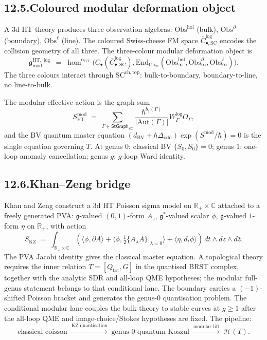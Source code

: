 \documentclass[11pt,reqno]{amsart}
\theoremstyle{definition}
\theoremstyle{remark}
\providecommand{\cH}{\mathcal{H}}
\providecommand{\Aut}{\mathrm{Aut}}
\providecommand{\FM}{\overline{C}}
\providecommand{\fg}{\mathfrak{g}}
\providecommand{\hol}{\mathrm{hol}}
\providecommand{\bC}{\mathbb{C}}
\providecommand{\bR}{\mathbb{R}}
\providecommand{\SCchtop}{\mathrm{SC}^{\mathrm{ch,top}}}
\providecommand{\End}{\mathrm{End}}
\providecommand{\KZ}{\mathrm{KZ}}
\providecommand{\SC}{\mathrm{SC}}
\providecommand{\BV}{\mathrm{BV}}
\renewcommand{\mod}{\mathrm{mod}}
\providecommand{\Obs}{\mathrm{Obs}}
\providecommand{\Ch}{\mathrm{Ch}}
\numberwithin{equation}{section}
\begin{document}
\subsection*{12.5.\enspace Coloured modular deformation object}

A 3d HT theory produces three observation algebras:
$\Obs^{\hol}$ (bulk), $\Obs^\partial$ (boundary), $\Obs^\ell$
(line). The coloured Swiss-cheese FM space
$\FM^{\log}_{\bullet, \SC}$ encodes the collision geometry of
all three. The three-colour modular deformation object is
\[
\fg^{\mathrm{HT},\log}_{\mod}
\;=\;
\hom^{\alpha_{\mathrm{HT}}}\!\bigl(
C_\bullet(\FM^{\log}_{\bullet, \SC}),
\End_{\Ch_\infty}(\Obs^{\hol}_\infty, \Obs^\partial_\infty,
\Obs^\ell_\infty)\bigr).
\]
The three colours interact through $\SCchtop$: bulk-to-boundary,
boundary-to-line, no line-to-bulk.

The modular effective action is the graph sum
\[
S^{\mod}_{\mathrm{HT}}
\;=\;
\sum_{\Gamma \in \mathsf{StGraph}_{\SC}}
\frac{\hbar^{b_1(\Gamma)}}{|\Aut(\Gamma)|}
W^{\log}_\Gamma O_\Gamma,
\]
and the BV quantum master equation
$(d_{\BV} + \hbar\Delta_{\mathrm{odd}})\exp(S^{\mod}/\hbar) = 0$
is the single equation governing $T$. At genus $0$: classical
BV $\{S_0, S_0\} = 0$; genus $1$: one-loop anomaly cancellation;
genus $g$: $g$-loop Ward identity.

\subsection*{12.6.\enspace Khan--Zeng bridge}

Khan and Zeng construct a 3d HT Poisson sigma model on
$\bR_+ \times \bC$ attached to a freely generated PVA:
$\fg$-valued $(0,1)$-form $A_{\bar z}$, $\fg^*$-valued scalar
$\phi$, $\fg$-valued $1$-form $\eta$ on $\bR_+$, with action
\[
S_{\KZ}
\;=\;
\int_{\bR_+\times\bC}
(\langle\phi, \bar\partial A\rangle
+ \langle\phi, \tfrac12\{A_\lambda A\}|_{\lambda=0}\rangle
+ \langle\eta, d_t\phi\rangle)\,dt\wedge dz\wedge d\bar z.
\]
The PVA Jacobi identity gives the classical master equation. A
topological theory requires the inner relation
$T=[Q_{\mathrm{tot}},G]$ in the quantised BRST complex, together with
the analytic SDR and all-loop QME hypotheses; the modular full-genus
statement belongs to that conditional lane.
The boundary carries a $(-1)$-shifted Poisson bracket and generates the
genus-$0$ quantisation problem. The conditional modular lane couples the
bulk theory to stable curves at $g \ge 1$ after the all-loop QME and
image-choice/Stokes hypotheses are fixed. The pipeline:
\[
\text{classical coisson}
\;\xrightarrow{\text{KZ quantisation}}\;
\text{genus-$0$ quantum Koszul}
\;\xrightarrow{\text{modular lift}}\;
\cH(T).
\]
\end{document}
